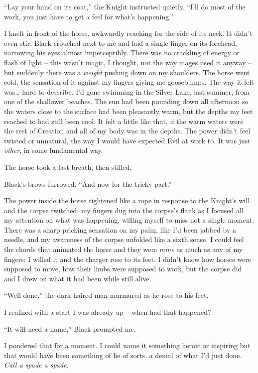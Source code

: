 \documentclass[12pt, openany]{book}
\begin{document}
“Lay your hand on its coat,” the Knight instructed quietly. “I’ll do most of the work, you just have to get a feel for what’s happening.”

I knelt in front of the horse, awkwardly reaching for the side of its neck. It didn’t even stir. Black crouched next to me and laid a single finger on its forehead, narrowing his eyes almost imperceptibly. There was no crackling of energy or flash of light – this wasn’t magic, I thought, not the way mages used it anyway – but suddenly there was a \textit{weight} pushing down on my shoulders. The horse went cold, the sensation of it against my fingers giving me goosebumps. The way it felt was… hard to describe. I’d gone swimming in the Silver Lake, last summer, from one of the shallower beaches. The sun had been pounding down all afternoon so the waters close to the surface had been pleasantly warm, but the depths my feet reached to had still been cool. It felt a little like that, if the warm waters were the rest of Creation and all of my body was in the depths. The power didn’t feel twisted or unnatural, the way I would have expected Evil at work to. It was just \textit{other}, in some fundamental way.

The horse took a last breath, then stilled. 

Black’s brows furrowed. “And now for the tricky part.”

The power inside the horse tightened like a rope in response to the Knight’s will and the corpse twitched: my fingers dug into the corpse’s flank as I focused all my attention on what was happening, willing myself to miss not a single moment. There was a sharp pricking sensation on my palm, like I’d been jabbed by a needle, and my awareness of the corpse unfolded like a sixth sense. I could feel the chords that animated the horse and they were \textit{mine} as much as any of my fingers: I willed it and the charger rose to its feet. I didn’t know how horses were supposed to move, how their limbs were supposed to work, but the corpse did and I drew on what it had been while still alive.

“Well done,” the dark-haired man murmured as he rose to his feet.

I realized with a start I was already up – when had that happened?

“It will need a name,” Black prompted me.

I pondered that for a moment. I could name it something heroic or inspiring but that would have been something of lie of sorts, a denial of what I’d just done. \textit{Call a spade a spade.}
\end{document}

